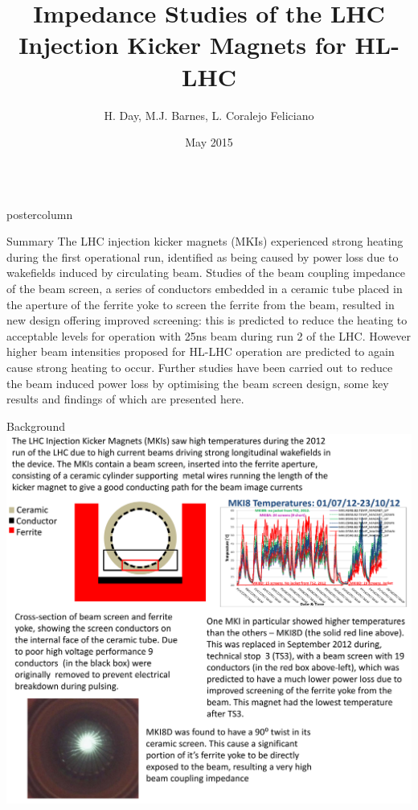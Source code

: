 \documentclass[final,hyperref={pdfpagelabels=false}]{beamer}
\title{Impedance Studies of the LHC Injection Kicker Magnets for HL-LHC}
\author{H. Day, M.J. Barnes, L. Coralejo Feliciano}
\institute[CERN]{CERN, Geneva, Switzerland}
\date[May 2015]{May 2015}
\newlength{\columnheight}
\begin{document}
\begin{frame}
  \begin{columns}
    \begin{column}{.49\textwidth}
      \begin{beamercolorbox}[center,wd=\textwidth]{postercolumn}
        \begin{minipage}[T]{.95\textwidth}  %
          \parbox[t][\columnheight]{\textwidth}{ %
            \begin{block}{Summary}
\small{
The LHC injection kicker magnets (MKIs) experienced strong heating during the first operational run, identified as being caused by power loss due to wakefields induced by circulating beam. Studies of the beam coupling impedance of the beam screen, a series of conductors embedded in a ceramic tube placed in the aperture of the ferrite yoke to screen the ferrite from the beam, resulted in new design offering improved screening: this is predicted to reduce the heating to acceptable levels for operation with 25ns beam during run 2 of the LHC. However higher beam intensities proposed for HL-LHC operation are predicted to again cause strong heating to occur. Further studies have been carried out to reduce the beam induced power loss by optimising the beam screen design, some key results and findings of which are presented here.
}
\end{block}
            \vfill
	\begin{block}{Background}
\includegraphics[width=1.0\textwidth]{introductionPicture.pdf}

\end{block}}
\end{minipage}
\end{beamercolorbox}
\end{column}
\end{columns}
\end{frame}
\end{document}
